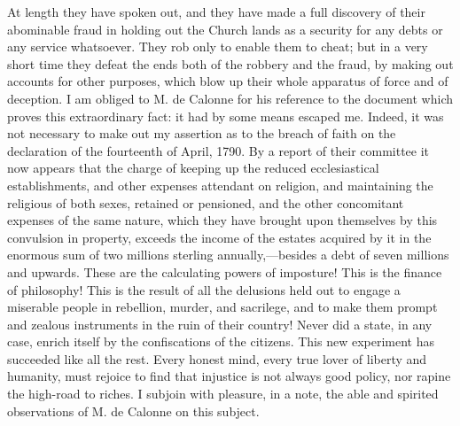 At length they have spoken out, and they have made a full discovery of their abominable fraud in holding out the Church lands as a security for any debts or any service whatsoever. They rob only to enable them to cheat; but in a very short time they defeat the ends both of the robbery and the fraud, by making out accounts for other purposes, which blow up their whole apparatus of force and of deception. I am obliged to M. de Calonne for his reference to the document which proves this extraordinary fact: it had by some means escaped me. Indeed, it was not necessary to make out my assertion as to the breach of faith on the declaration of the fourteenth of April, 1790. By a report of their committee it now appears that the charge of keeping up the reduced ecclesiastical establishments, and other expenses attendant on religion, and maintaining the religious of both sexes, retained or pensioned, and the other concomitant expenses of the same nature, which they have brought upon themselves by this convulsion in property, exceeds the income of the estates acquired by it in the enormous sum of two millions sterling annually,—besides a debt of seven millions and upwards. These are the calculating powers of imposture! This is the finance of philosophy! This is the result of all the delusions held out to engage a miserable people in rebellion, murder, and sacrilege, and to make them prompt and zealous instruments in the ruin of their country! Never did a state, in any case, enrich itself by the confiscations of the citizens. This new experiment has succeeded like all the rest. Every honest mind, every true lover of liberty and humanity, must rejoice to find that injustice is not always good policy, nor rapine the high-road to riches. I subjoin with pleasure, in a note, the able and spirited observations of M. de Calonne on this subject.
